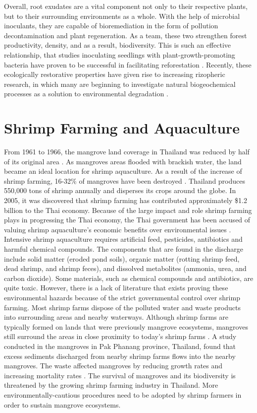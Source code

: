   Overall, root exudates are a vital component not only to their respective plants, but to their surrounding environments as a whole. With the help of microbial inoculants, they are capable of bioremediation in the form of pollution decontamination and plant regeneration. As a team, these two strengthen forest productivity, density, and as a result, biodiversity. This is such an effective relationship, that studies inoculating seedlings with plant-growth-promoting bacteria have proven to be successful in facilitating reforestation \citep{bashan2008environmental}. Recently, these ecologically restorative properties have given rise to increasing rizopheric research, in which many are beginning to investigate natural biogeochemical processes as a solution to environmental degradation \citep{shukla2011nature}. 


\section{Shrimp Farming and Aquaculture}
From 1961 to 1966, the mangrove land coverage in Thailand was reduced by half of its original area \citep{naito2014relationship}.  As mangroves areas flooded with brackish water, the land became an ideal location for shrimp aquaculture. As a result of the increase of shrimp farming, 16-32\% of mangroves have been destroyed \citep{chambers2011aquaculture}. Thailand produces 550,000 tons of shrimp annually and disperses its crops around the globe. In 2005, it was discovered that shrimp farming has contributed approximately \$1.2 billion to the Thai economy. Because of the large impact and role shrimp farming plays in progressing the Thai economy, the Thai government has been accused of valuing shrimp aquaculture's economic benefits over environmental issues \citep{trisurat2006community}. Intensive shrimp aquaculture requires artificial feed, pesticides, antibiotics and harmful chemical compounds. The components that are found in the discharge include solid matter (eroded pond soils), organic matter (rotting shrimp feed, dead shrimp, and shrimp feces), and dissolved metabolites (ammonia, urea, and carbon dioxide). Some materials, such as chemical compounds and antibiotics, are quite toxic. However, there is a lack of literature that exists proving these environmental hazards because of the strict governmental control over shrimp farming. Most shrimp farms dispose of the polluted water and waste products into surrounding areas and nearby waterways. Although shrimp farms are typically formed on lands that were previously mangrove ecosystems, mangroves still surround the areas in close proximity to today's shrimp farms \citep{aksornkoae2004overview}. A study conducted in the mangroves in Pak Phanang province, Thailand, found  that excess sediments discharged from nearby shrimp farms flows into the nearby mangroves. The waste affected mangroves by reducing growth rates and increasing mortality rates \citep{vaiphasa2007impact}. The survival of mangroves and its biodiversity is threatened by the growing shrimp farming industry in Thailand. More environmentally-cautious procedures need to be adopted by shrimp farmers in order to sustain mangrove ecosystems. 

